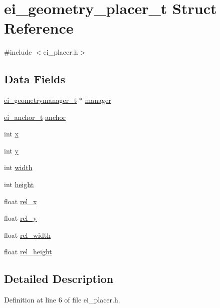 \hypertarget{structei__geometry__placer__t}{
\section{ei\_\-geometry\_\-placer\_\-t Struct Reference}
\label{structei__geometry__placer__t}
}


{\ttfamily \#include $<$ei\_\-placer.h$>$}\subsection*{Data Fields}
\begin{DoxyCompactItemize}
\item 
\hyperlink{structei__geometrymanager__t}{ei\_\-geometrymanager\_\-t} $\ast$ \hyperlink{structei__geometry__placer__t_a320ea8bfaeb574dd063bacc8d9fd6b95}{manager}
\item 
\hyperlink{ei__types_8h_a3852c963af609d31d7cfcff79c4c8450}{ei\_\-anchor\_\-t} \hyperlink{structei__geometry__placer__t_a15ef38c40c297ac10bd479c6a41089fd}{anchor}
\item 
int \hyperlink{structei__geometry__placer__t_a02641ff992aaeb35a51f03c7b0b41986}{x}
\item 
int \hyperlink{structei__geometry__placer__t_a476cd4ccb404cd5d721c5d0c660e668c}{y}
\item 
int \hyperlink{structei__geometry__placer__t_a768d062aa067ee8fe05863cd5b30e350}{width}
\item 
int \hyperlink{structei__geometry__placer__t_a52d0612ff524b4a058bc29000de5cecf}{height}
\item 
float \hyperlink{structei__geometry__placer__t_af290c8cbf1fe4235bb81d4997a53b4ec}{rel\_\-x}
\item 
float \hyperlink{structei__geometry__placer__t_ac6ca9e4bf2fb1a9d4494fc9a1abf412c}{rel\_\-y}
\item 
float \hyperlink{structei__geometry__placer__t_a92077f3d2d7342777ec5233ee5d7057c}{rel\_\-width}
\item 
float \hyperlink{structei__geometry__placer__t_a5948694b44ef0b05a7168667f7cfb3f9}{rel\_\-height}
\end{DoxyCompactItemize}


\subsection{Detailed Description}


Definition at line 6 of file ei\_\-placer.h.

